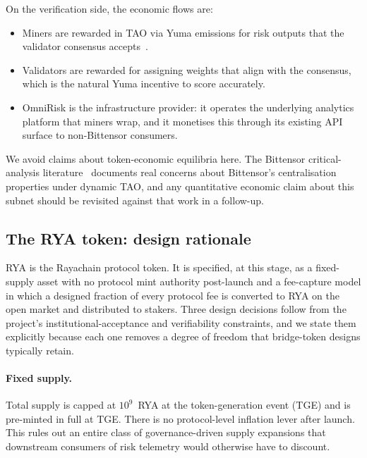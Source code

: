 \documentclass[11pt,a4paper]{article}
\begin{document}
On the verification side, the economic flows are:
\begin{itemize}
  \item Miners are rewarded in TAO via Yuma emissions for risk outputs that the
        validator consensus accepts~\cite{opentensor2024yuma,steeves2022incentivizing}.
  \item Validators are rewarded for assigning weights that align with the consensus,
        which is the natural Yuma incentive to score accurately.
  \item OmniRisk is the infrastructure provider: it operates the underlying analytics
        platform that miners wrap, and it monetises this through its existing API
        surface to non-Bittensor consumers.
\end{itemize}
We avoid claims about token-economic equilibria here. The Bittensor critical-analysis
literature~\cite{lui2025bittensor} documents real concerns about Bittensor's
centralisation properties under dynamic TAO, and any quantitative economic claim about
this subnet should be revisited against that work in a follow-up.

\subsection{The RYA token: design rationale}\label{sec:economics:rya:design}

\textsc{RYA} is the Rayachain protocol token. It is specified, at this stage, as a
fixed-supply asset with no protocol mint authority post-launch and a fee-capture
model in which a designed fraction of every protocol fee is converted to RYA on the
open market and distributed to stakers. Three design decisions follow from the
project's institutional-acceptance and verifiability constraints, and we state them
explicitly because each one removes a degree of freedom that bridge-token designs
typically retain.

\paragraph{Fixed supply.} Total supply is capped at $10^9$~RYA at the
token-generation event (TGE) and is pre-minted in full at TGE. There is no
protocol-level inflation lever after launch. This rules out an entire class of
governance-driven supply expansions that downstream consumers of risk telemetry
would otherwise have to discount.
\end{document}
